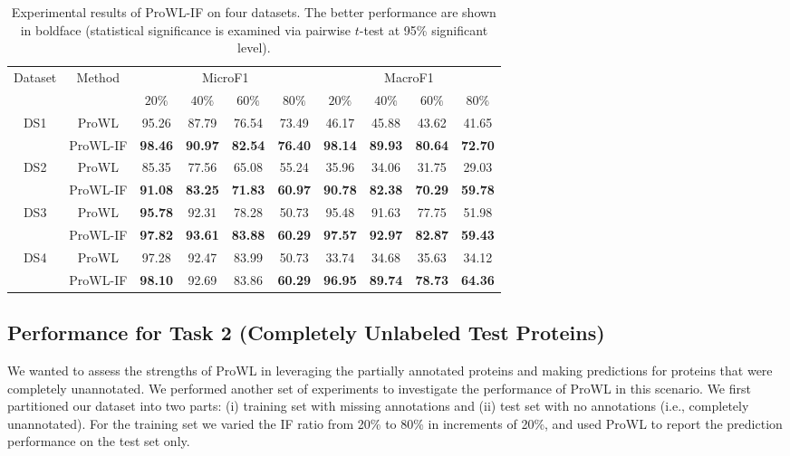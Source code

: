 \documentclass{llncs} %
\begin{document}
\begin{table}[h!]
\scriptsize
\caption{Experimental results of ProWL-IF on four datasets. The better performance are shown in boldface (statistical significance is examined via pairwise $t$-test at 95\% significant level).}
\centering
\begin{tabular}{|c|c||c|c|c|c||c|c|c|c|}
\hline
\multirow{2}{*}{Dataset}&
\multirow{2}{*}{Method}&
\multicolumn{4}{|c||}{MicroF1}&
\multicolumn{4}{|c|}{MacroF1}\\
\cline{3-10}
& & $20\%$& $40\%$& $60\%$ & $80\%$ &  $20\%$& $40\%$& $60\%$ & $80\%$\\
\hline
\multirow{2}{*}{DS1}
&ProWL &95.26	&87.79	&76.54 &73.49 &46.17 &45.88	&43.62 &41.65\\
&ProWL-IF &\bf 98.46 &\bf90.97	&\bf 82.54 &\bf 76.40 &\bf 98.14 &\bf 89.93	&\bf 80.64 &\bf 72.70\\
\hline
\multirow{2}{*}{DS2}
&ProWL &85.35 &77.56 &65.08 &55.24 &35.96	&34.06	&31.75 &29.03\\
&ProWL-IF &\bf 91.08 &\bf 83.25 &\bf 71.83 &\bf 60.97 &\bf 90.78 &\bf 82.38	&\bf 70.29 &\bf 59.78\\
\hline
\multirow{2}{*}{DS3}
&ProWL &\bf 95.78 &92.31 &78.28 &50.73 &95.48 &91.63 &77.75 &51.98\\
&ProWL-IF &\bf 97.82 &\bf 93.61 &\bf 83.88 &\bf 60.29 &\bf 97.57 &\bf 92.97	&\bf 82.87 &\bf 59.43\\
\hline
\multirow{2}{*}{DS4}
&ProWL &97.28	&92.47	&83.99 &50.73 &33.74	&34.68	&35.63 &34.12\\
&ProWL-IF &\bf 98.10 &92.69	&83.86 &\bf 60.29 &\bf 96.95	&\bf 89.74	&\bf 78.73 &\bf 64.36\\
\hline
\end{tabular}
\label{Table9}
\end{table}
\subsection{Performance for Task 2 (Completely Unlabeled Test Proteins)}
We wanted to assess the strengths of ProWL in
leveraging the partially annotated proteins and making predictions for
proteins that were completely unannotated. We performed another set of experiments to investigate the performance of ProWL in this scenario. We first partitioned our dataset into two parts: (i) training set with missing annotations and (ii) test set  with no annotations (i.e., completely unannotated). For the training set we varied the IF ratio from 20\% to 80\% in increments of 20\%, and used ProWL to report the prediction performance on the test set only.
\end{document}
